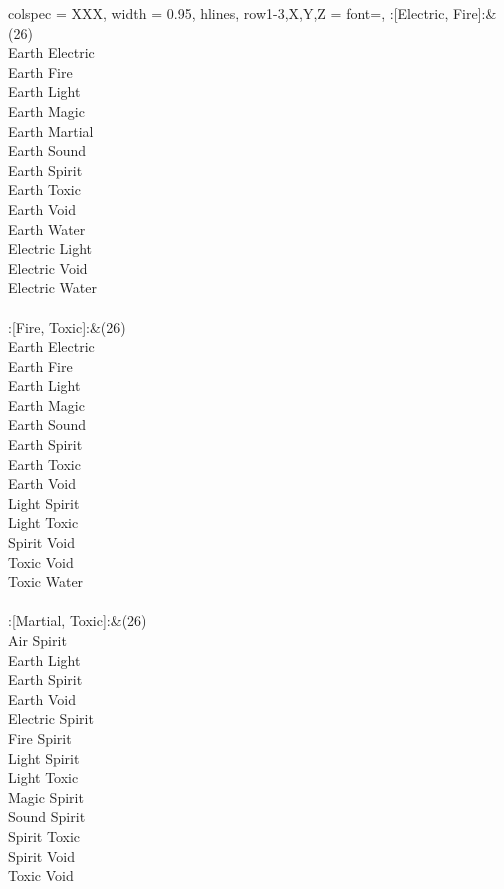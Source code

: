 \begin{longtblr}[
	caption = {2v2 Defending Resisted},
	label = {2v2-Defending-Resisted},
]{
	colspec = {XXX}, width = 0.95\linewidth,
	hlines,
	row{1-3,X,Y,Z} = {font=\bfseries},
}
	:[Electric, Fire]:&{(26)\\
	Earth Electric \\
	Earth Fire \\
	Earth Light \\
	Earth Magic \\
	Earth Martial \\
	Earth Sound \\
	Earth Spirit \\
	Earth Toxic \\
	Earth Void \\
	Earth Water \\
	Electric Light \\
	Electric Void \\
	Electric Water \\
	}\\

	:[Fire, Toxic]:&{(26)\\
	Earth Electric \\
	Earth Fire \\
	Earth Light \\
	Earth Magic \\
	Earth Sound \\
	Earth Spirit \\
	Earth Toxic \\
	Earth Void \\
	Light Spirit \\
	Light Toxic \\
	Spirit Void \\
	Toxic Void \\
	Toxic Water \\
	}\\

	:[Martial, Toxic]:&{(26)\\
	Air Spirit \\
	Earth Light \\
	Earth Spirit \\
	Earth Void \\
	Electric Spirit \\
	Fire Spirit \\
	Light Spirit \\
	Light Toxic \\
	Magic Spirit \\
	Sound Spirit \\
	Spirit Toxic \\
	Spirit Void \\
	Toxic Void \\
	}\\


\end{longtblr}
